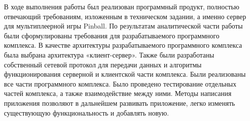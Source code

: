 \Conclusion

В ходе выполнения работы был реализован программный продукт, полностью отвечающий требованиям, изложенным в техническом задании, а именно сервер для мультиплеерной игры Pinball. 
По результатам аналитической части работы были сформулированы требования для разрабатываемого программного комплекса.
В качестве архитектуры разрабатываемого программного комплекса была выбрана архитектура «клиент-сервер». Также были разработаны собственный сетевой протокол для передачи данных и алгоритмы функционирования серверной и клиентской части комплекса.
Были реализованы все части программного комплекса. Было проведено тестирование отдельных частей комплекса, а также взаимодействие между ними.
Методы написания приложения позволяют в дальнейшем развивать приложение, легко изменять существующую функциональность и добавлять новую.
